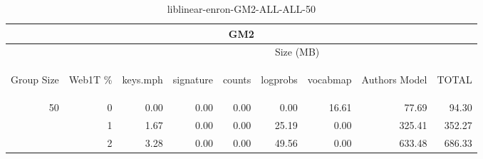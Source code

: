 \begin{center}
\begin{table}[htbp] 
 \begin{center}
\begin{tabular}{ | r | r | r | r | r | r | r | r | r |}
\hline
\multicolumn{9}{|c|}{GM2}\\
\hline
 & & \multicolumn{7}{|c|}{Size (MB)}\\ \cline{3-9}
\begin{sideways}Group Size\end{sideways} & \begin{sideways}Web1T \% \end{sideways} & \begin{sideways}keys.mph\end{sideways} & \begin{sideways}signature\end{sideways} & \begin{sideways}counts\end{sideways} & \begin{sideways}logprobs\end{sideways} & \begin{sideways}vocabmap\end{sideways} & \begin{sideways}Authors Model \end{sideways} & \begin{sideways}TOTAL\end{sideways}\\
\hline
\multirow{2}{*}{50}
 & 0 & 0.00 & 0.00 & 0.00 & 0.00 & 16.61 & 77.69 & 94.30\\ \cline{2-9}
 & 1 & 1.67 & 0.00 & 0.00 & 25.19 & 0.00 & 325.41 & 352.27\\ \cline{2-9}
 & 2 & 3.28 & 0.00 & 0.00 & 49.56 & 0.00 & 633.48 & 686.33\\ \cline{2-9}
\hline
\end{tabular}
\caption{liblinear-enron-GM2-ALL-ALL-50}
\label{table:liblinear-enron-GM2-ALL-ALL-50}
\end{center}
 \end{table}
\end{center}

